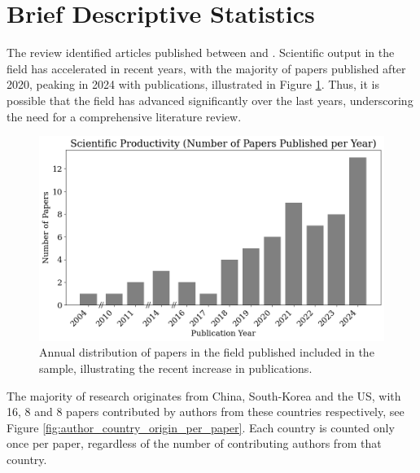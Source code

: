 
\section{Brief Descriptive Statistics}
\label{sec:descriptive_statistics}
The review identified \samplesize articles published between \samplestart and \sampleend. Scientific output in the field has accelerated in recent years, with the majority of papers published after 2020, peaking in 2024 with \articlesthisyear publications, illustrated in Figure \ref{fig:scientific_productivity}. Thus, it is possible that the field has advanced significantly over the last years, underscoring the need for a comprehensive literature review.

\begin{figure}[H]
    \centering
    \includegraphics[width=1\linewidth]{Images/scientific_productivity.png}
    \caption[Annual distribution of papers published]{Annual distribution of papers in the field published included in the sample, illustrating the recent increase in publications.}
    \label{fig:scientific_productivity}
\end{figure}

The majority of research originates from China, South-Korea and the US, with 16, 8 and 8 papers contributed by authors from these countries respectively, see Figure \ref{fig:author_country_origin_per_paper}. Each country is counted only once per paper, regardless of the number of contributing authors from that country.  

